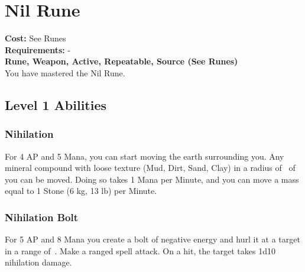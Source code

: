 \twocolumn
\section{Nil Rune}\label{rune:nil}
\textbf{Cost:} See Runes\\
\textbf{Requirements:} -\\
\textbf{Rune, Weapon, Active, Repeatable, Source (See Runes)}\\
You have mastered the Nil Rune.

\subsection{Level 1 Abilities}

\subsubsection{Nihilation }
For 4 AP and 5 Mana, you can start moving the earth surrounding you.
Any mineral compound with loose texture (Mud, Dirt, Sand, Clay) in a radius of~ of you can be moved.
Doing so takes 1 Mana per Minute, and you can move a mass equal to 1 Stone (6 kg, 13 lb) per Minute.

\subsubsection{Nihilation Bolt}
For 5 AP and 8 Mana you create a bolt of negative energy and hurl it at a target in a range of~.
Make a ranged spell attack.
On a hit, the target takes 1d10 nihilation damage.